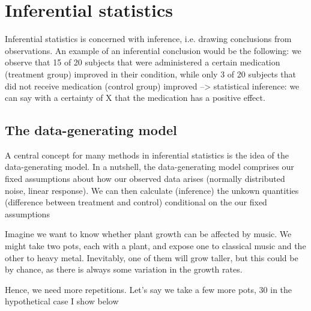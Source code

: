 \documentclass[a4paper,twoside]{tufte-book}\usepackage[]{graphicx}\usepackage[]{color}
\begin{document}
{\begin{fullwidth}
\begin{mdframed}
\end{mdframed}
\end{fullwidth} 


\chapter{Inferential statistics}


Inferential statistics is concerned with inference, i.e. drawing conclusions from observations. An example of an inferential conclusion would be the following: we observe that 15 of 20 subjects that were administered a certain medication (treatment group) improved in their condition, while only 3 of 20 subjects that did not receive medication (control group) improved --> statistical inference: we can say with a certainty of X that the medication has a positive effect.  


\section{The data-generating model}


A central concept for many methods in inferential statistics is the idea of the data-generating model. In a nutshell, the data-generating model comprises our fixed assumptions about how our observed data arises (normally distributed noise, linear response). We can then calculate (inference) the unkown quantities (difference between treatment and control) conditional on the our fixed assumptions 


Imagine we want to know whether plant growth can be affected by music. We might take two pots, each with a plant, and expose one to classical music and the other to heavy metal. Inevitably, one of them will grow taller, but this could be by chance, as there is always some variation in the growth rates. 

Hence, we need more repetitions. Let's say we take a few more pots, 30 in the hypothetical case I show below

}
\end{document}
